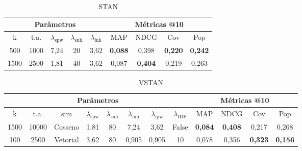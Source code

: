\begin{table}[htbp]
  \centering
  \begin{tabular}{|c|c|c|c|c|c|c|c|c|}
    \hline
      \multicolumn{5}{|c|}{Parâmetros} & \multicolumn{4}{c|}{Métricas @10} \\
      \hline
      k & t.a. & $\lambda_{\text{spw}}$ & $\lambda_{\text{snh}}$ & $\lambda_{\text{inh}}$ & MAP & NDCG & Cov & Pop \\
      \hline
      500 & 1000 & 7,24 & 20 & 3,62 & \textbf{0,088} & 0,398 & \textbf{0,220} & \textbf{0,242} \\
      \hline
      1500 & 2500 & 1,81 & 40 & 3,62 & 0,087 & \textbf{0,404} & 0,219 & 0,263 \\
      \hline 
\end{tabular}
      \caption{STAN}
      \label{opt:stan_rem}
\end{table}

\begin{table}[htbp]
  \centering
  \begin{tabular}{|c|c|c|c|c|c|c|c|c|c|c|c|}
    \hline
      \multicolumn{8}{|c|}{Parâmetros} & \multicolumn{4}{c|}{Métricas @10} \\
      \hline
      k & t.a. & sim & $\lambda_{\text{spw}}$ & $\lambda_{\text{snh}}$ & $\lambda_{\text{inh}}$ & $\lambda_{\text{ipw}}$ & $\lambda_{\text{IDF}}$ & MAP & NDCG & Cov & Pop \\
      \hline
      1500 & 10000 & Cosseno & 1,81 & 80 & 7,24 & 3,62 & False & \textbf{0,084} & \textbf{0,408} & 0,217 & 0,268 \\
      \hline
      100 & 2500 & Vetorial & 3,62 & 80 & 0,905 & 0,905 & 10 & 0,078 & 0,356 & \textbf{0,323} & \textbf{0,156} \\
      \hline
\end{tabular}
      \caption{VSTAN}
      \label{opt:vstan_rem}
\end{table}

